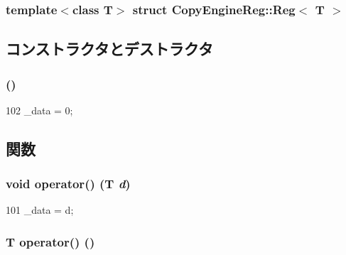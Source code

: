 \subsubsection*{template$<$class T$>$ struct CopyEngineReg::Reg$<$ T $>$}



\subsection{コンストラクタとデストラクタ}
\hypertarget{structCopyEngineReg_1_1Reg_a93961d9c207640497631d54c51526721}{
\subsubsection[{Reg}]{ ()}}
\label{structCopyEngineReg_1_1Reg_a93961d9c207640497631d54c51526721}



\begin{DoxyCode}
102 { _data = 0; }
\end{DoxyCode}


\subsection{関数}
\hypertarget{structCopyEngineReg_1_1Reg_ad75a4d427f25956add1791f7b59fe1cb}{
\subsubsection[{operator()}]{\setlength{\rightskip}{0pt plus 5cm}void operator() (T {\em d})}}
\label{structCopyEngineReg_1_1Reg_ad75a4d427f25956add1791f7b59fe1cb}



\begin{DoxyCode}
101 { _data = d; }
\end{DoxyCode}
\hypertarget{structCopyEngineReg_1_1Reg_aaba2db6079c528211c6b095cdb08fcf6}{
\subsubsection[{operator()}]{\setlength{\rightskip}{0pt plus 5cm}T operator() ()}}
\label{structCopyEngineReg_1_1Reg_aaba2db6079c528211c6b095cdb08fcf6}



